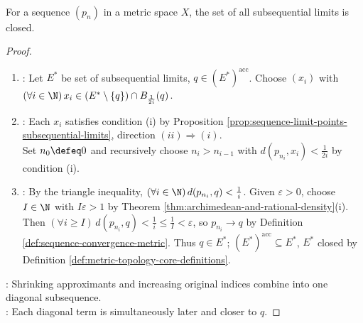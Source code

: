 \begin{theorem} \label{thm:subsequential-limits-closed} \\
For a sequence $(p_n)$ in a metric space $X$, the set of all subsequential limits is closed.
\begin{proof}
\begin{enumerate}[label=(\roman*)]
\setlength{\itemsep}{0pt}
\item {}: Let $E^*$ be set of subsequential limits, $q\in(E^*)^{\operatorname{acc}}$. Choose $(x_i)$ with $(\forall i\in\N)\,x_i\in(E^*\setminus\{q\})\cap B_{\frac{1}{2i}}(q)$.
\item {}: Each $x_i$ satisfies condition (i) by Proposition \ref{prop:sequence-limit-points-subsequential-limits}, direction $(ii)\Rightarrow(i)$.\\
Set $n_0\defeq0$ and recursively choose $n_i>n_{i-1}$ with $d(p_{n_i},x_i)<\frac{1}{2i}$ by condition (i).
\item {}: By the triangle inequality, $(\forall i\in\N)\,d(p_{n_i},q)<\frac{1}{i}$. Given $\varepsilon>0$, choose $I\in\N$ with $I\varepsilon>1$ by Theorem \ref{thm:archimedean-and-rational-density}(i).\\
Then $(\forall i\geq I)\,d(p_{n_i},q)<\frac{1}{i}\leq\frac{1}{I}<\varepsilon$, so $p_{n_i}\to q$ by Definition \ref{def:sequence-convergence-metric}. Thus $q\in E^*$; $(E^*)^{\operatorname{acc}}\subseteq E^*$, $E^*$ closed by Definition \ref{def:metric-topology-core-definitions}.
\end{enumerate}
: Shrinking approximants and increasing original indices combine into one diagonal subsequence.\\
: Each diagonal term is simultaneously later and closer to $q$.
\end{proof}
\end{theorem}

